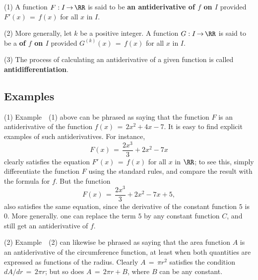 {\V

        (1) A function $F:I \,{\rightarrow}\, {\RR}$ is said to be {\bf an antiderivative of $f$ on $I$} provided $F'(x) \,=\, f(x)$ for all $x$ in $I$.

\V

        (2) More generally, let $k$ be a positive integer. A function $G:I \,{\rightarrow}\, {\RR}$ is said to be a {\bf {} of $f$ on $I$} provided $G^{(k)}(x) \,=\, f(x)$ for all $x$ in $I$.

\V

        (3) The process of calculating an antiderivative of a given function is called {\bf antidifferentiation}.


\V
\V

             \subsection{\small{\bf Examples}}
            \label{ExampE45.40}

\V

\hspace*{\parindent}(1) Example~~(1) above can be phrased as saying that the function $F$ is an antiderivative of the function $f(x) \,=\, 2x^{2} + 4x -7$.
    It is easy to find explicit examples of such antiderivatives. For instance,
        \begin{displaymath}
        F(x) \,=\, \frac{2x^{3}}{3} + 2x^{2} - 7x
        \end{displaymath}
    clearly satisfies the equation $F'(x) \,=\, f(x)$ for all $x$ in ${\RR}$; to see this, simply differentiate the function $F$ using the standard rules, and compare the result with the formula for $f$.
    But the function
        \begin{displaymath}
        F(x) \,=\, \frac{2x^{3}}{3} + 2x^{2} - 7x + 5,
        \end{displaymath}
    also satisfies the same equation, since the derivative of the constant function $5$ is $0$.
    More generally. one can replace the term $5$ by any constant function $C$, and still get an antiderivative of $f$.

\V

        (2) Example~~(2) can likewise be phrased as saying that the area function $A$ is an antiderivative of the circumference function, at least when both quantities are expressed as functions of the radius.
    Clearly $A \,=\, {\pi}r^{2}$ satisfies the condition $dA/dr \,=\, 2{\pi}r$; but so does $A \,=\, 2{\pi}r + B$, where $B$ can be any constant.


}
